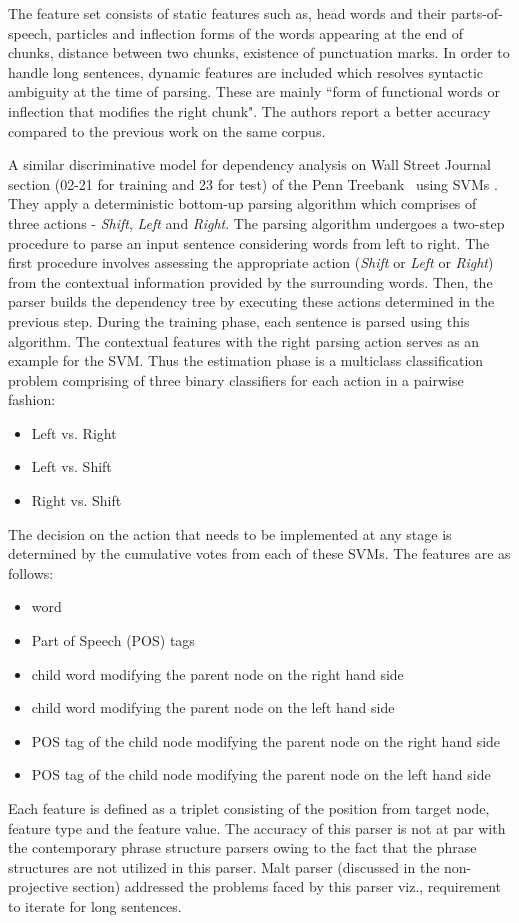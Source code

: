 The feature set consists of static features such as, head words and their parts-of-speech, particles and inflection forms of the words appearing at the end of chunks, distance between two chunks, existence of punctuation marks. In order to handle long sentences, dynamic features are included which resolves syntactic ambiguity at the time of parsing. These are mainly ``form of functional words or inflection that modifies the right chunk". The authors report a better accuracy compared to the previous work on the same corpus.

A similar discriminative model for dependency analysis on Wall Street Journal section (02-21 for training and 23 for test) of the Penn Treebank~\citep{Marcus:1994:PTA:1075812.1075835} using SVMs \cite{yamada2003statistical}.  They apply a deterministic bottom-up parsing algorithm which comprises of three actions - \textit{Shift}, \textit{Left} and \textit{Right}. The parsing algorithm undergoes a two-step procedure to parse an input sentence considering words from left to right. The first procedure involves assessing the appropriate action (\textit{Shift} or  \textit{Left} or \textit{Right}) from the contextual information provided by the surrounding words. Then, the parser builds the dependency tree by executing these actions determined in the previous step. During the training phase, each sentence is parsed using this algorithm. The contextual features with the right parsing action serves as an example for the SVM. Thus the estimation phase is a multiclass classification problem comprising of three binary classifiers for each action in a pairwise fashion:
\begin{itemize}
\item Left vs. Right
\item Left vs. Shift
\item Right vs. Shift
\end{itemize}
The decision on the action that needs to be implemented at any stage is determined by the cumulative votes from each of these SVMs. 
The features are as follows:
\begin{itemize}
\item word
\item Part of Speech (POS) tags
\item child word modifying the parent node on the right hand side
\item child word modifying the parent node on the left hand side
\item POS tag of the child node modifying the parent node on the right hand side
\item POS tag of the child node modifying the parent node on the left hand side
\end{itemize}
Each feature is defined as a triplet consisting of the position from target node, feature type and the feature value. The accuracy of this parser is not at par with the contemporary phrase structure parsers owing to the fact that the phrase structures are not utilized in this parser. Malt parser (discussed in the non-projective section) addressed the problems faced by this parser viz., requirement to iterate for long sentences.

